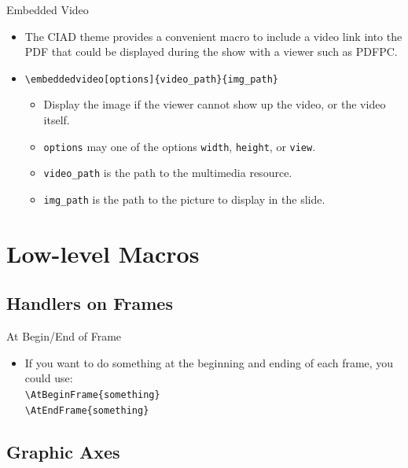 \documentclass[english,sectioncirclenumberstyle]{ciadbeamer}
\begin{document}
\begin{frame}[t]{Embedded Video}
	\begin{itemize}
	\item The CIAD theme provides a convenient macro to include a video link into the PDF that could be displayed during the show with a viewer such as PDFPC.
	\item \texttt{{\textbackslash}embeddedvideo[options]\{video\_path\}\{img\_path\}}
		\begin{itemize}
		\item Display the image if the viewer cannot show up the video, or the video itself.
		\item \texttt{options} may one of the options \texttt{width}, \texttt{height}, or \texttt{view}.
		\item \texttt{video\_path} is the path to the multimedia resource.
		\item \texttt{img\_path} is the path to the picture to display in the slide.
		\end{itemize}
	\end{itemize}
\end{frame}

\section{Low-level Macros}
\tableofcontentslide[sectionstyle={show/shaded},subsectionstyle={show/show/hide},subsubsectionstyle={hide/hide/hide/hide},sections={3-}]

\subsection{Handlers on Frames}

\begin{frame}{At Begin/End of Frame}
	\begin{itemize}
	\item If you want to do something at the beginning and ending of each frame, you could use: \\
		\texttt{{\textbackslash}AtBeginFrame\{something\}} \\
		\texttt{{\textbackslash}AtEndFrame\{something\}}
	\end{itemize}
\end{frame}

\subsection{Graphic Axes}
\end{document}
